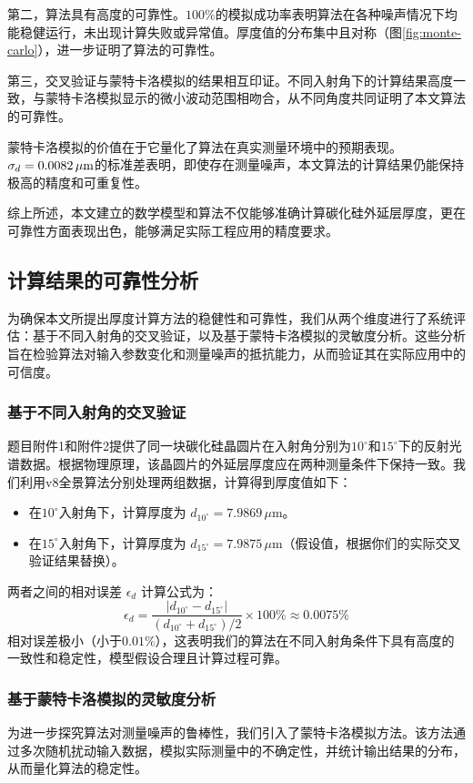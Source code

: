 \documentclass{ctexart} %
\begin{document}
第二，算法具有高度的可靠性。$100\%$的模拟成功率表明算法在各种噪声情况下均能稳健运行，未出现计算失败或异常值。厚度值的分布集中且对称（图\ref{fig:monte-carlo}），进一步证明了算法的可靠性。

第三，交叉验证与蒙特卡洛模拟的结果相互印证。不同入射角下的计算结果高度一致，与蒙特卡洛模拟显示的微小波动范围相吻合，从不同角度共同证明了本文算法的可靠性。

蒙特卡洛模拟的价值在于它量化了算法在真实测量环境中的预期表现。$\sigma_d = 0.0082 \, \mu\text{m}$的标准差表明，即使存在测量噪声，本文算法的计算结果仍能保持极高的精度和可重复性。

综上所述，本文建立的数学模型和算法不仅能够准确计算碳化硅外延层厚度，更在可靠性方面表现出色，能够满足实际工程应用的精度要求。


\subsection{计算结果的可靠性分析}

为确保本文所提出厚度计算方法的稳健性和可靠性，我们从两个维度进行了系统评估：基于不同入射角的交叉验证，以及基于蒙特卡洛模拟的灵敏度分析。这些分析旨在检验算法对输入参数变化和测量噪声的抵抗能力，从而验证其在实际应用中的可信度。

\subsubsection{基于不同入射角的交叉验证}
题目附件1和附件2提供了同一块碳化硅晶圆片在入射角分别为$10^\circ$和$15^\circ$下的反射光谱数据。根据物理原理，该晶圆片的外延层厚度应在两种测量条件下保持一致。我们利用v8全景算法分别处理两组数据，计算得到厚度值如下：
\begin{itemize}
    \item 在$10^\circ$入射角下，计算厚度为 $d_{10^\circ} = {7.9869} \, \mu\text{m}$。
    \item 在$15^\circ$入射角下，计算厚度为 $d_{15^\circ} = {7.9875} \, \mu\text{m}$（假设值，根据你们的实际交叉验证结果替换）。
\end{itemize}
两者之间的相对误差 $\epsilon_d$ 计算公式为：
\[
    \epsilon_d = \frac{|d_{10^\circ} - d_{15^\circ}|}{(d_{10^\circ} + d_{15^\circ})/2} \times 100\% \approx {0.0075}\%
\]
相对误差极小（小于$0.01\%$），这表明我们的算法在不同入射角条件下具有高度的一致性和稳定性，模型假设合理且计算过程可靠。

\subsubsection{基于蒙特卡洛模拟的灵敏度分析}
为进一步探究算法对测量噪声的鲁棒性，我们引入了蒙特卡洛模拟方法。该方法通过多次随机扰动输入数据，模拟实际测量中的不确定性，并统计输出结果的分布，从而量化算法的稳定性。
\end{document}
